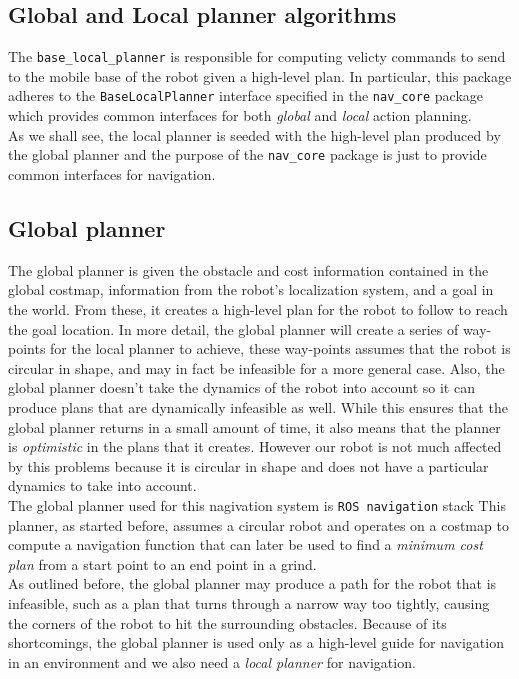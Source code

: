 \subsection{Global and Local planner algorithms}
The \texttt{base\_local\_planner} is responsible for computing velicty commands
to send to the mobile base of the robot given a high-level plan. In particular,
this package adheres to the \texttt{BaseLocalPlanner} interface specified in the 
\texttt{nav\_core} package which provides common interfaces for both \textit{global}
and \textit{local} action planning.
\\
As we shall see, the local planner is seeded with the high-level plan produced by
the global planner and the purpose of the \texttt{nav\_core} package is just to 
provide common interfaces for navigation. 

\subsection*{Global planner}
The global planner is given the obstacle and cost information contained
in the global costmap, information from the robot’s localization system, and
a goal in the world. From these, it creates a high-level plan for the robot
to follow to reach the goal location. In more detail, the global planner will
create a series of way-points for the local planner to achieve, these way-points
assumes that the robot is circular in shape, and may in fact be infeasible for a
more general case. Also, the global planner doesn’t take the dynamics of the
robot into account so it can produce plans that are dynamically infeasible as
well. While this ensures that the global planner returns in a small amount of
time, it also means that the planner is \textit{optimistic} in the plans that it creates.
However our robot is not much affected by this problems because it is circular
in shape and does not have a particular dynamics to take into account.
\\
The global planner used for this nagivation system is \texttt{ROS navigation} stack
This planner, as started before, assumes a circular robot and operates on a costmap 
to compute a navigation function that can later be used to find a \textit{minimum cost plan}
from a start point to an end point in a grind.
\\
As outlined before, the global planner may produce a path for the robot that is infeasible,
such as a plan that turns through a narrow way too tightly, causing the corners of the 
robot to hit the surrounding obstacles. Because of its shortcomings, the global planner 
is used only as a high-level guide for navigation in an environment and we also need a 
\textit{local planner} for navigation.

